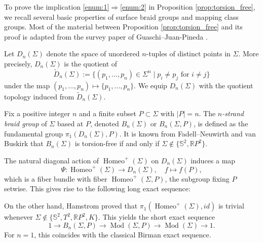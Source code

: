 \documentclass[12pt,a4paper]{amsart}
\numberwithin{equation}{section}
\DeclareMathOperator{\Mod}{Mod}
\DeclareMathOperator{\Homeo}{Homeo}
\theoremstyle{plain}
\theoremstyle{definition}
\theoremstyle{remark}
\begin{document}
To prove the implication \eqref{enum:1}$\Rightarrow$\eqref{enum:2} in Proposition \ref{prop:torsion_free}, we recall several basic properties of surface braid groups and mapping class groups.
Most of the material between Proposition \ref{prop:torsion_free} and its proof is adapted from the survey paper of Guaschi--Juan-Pineda \cite{MR3382024}.

Let $D_n(\Sigma)$ denote the space of unordered $n$-tuples of distinct points in $\Sigma$.
More precisely, $D_n(\Sigma)$ is the quotient of
\[
\tilde{D}_n(\Sigma) := \{ (p_1, \dots, p_n) \in \Sigma^n \mid p_i \neq p_j \text{ for } i \neq j \}
\]
under the map $(p_1, \dots, p_n) \mapsto \{p_1, \dots, p_n\}$.
We equip $D_n(\Sigma)$ with the quotient topology induced from $\tilde{D}_n(\Sigma)$.

Fix a positive integer $n$ and a finite subset $P \subset \Sigma$ with $|P| = n$.
The \emph{$n$-strand braid group} of $\Sigma$ based at $P$, denoted $B_n(\Sigma)$ or $B_n(\Sigma, P)$, is defined as the fundamental group $\pi_1(D_n(\Sigma), P)$.
It is known from Fadell--Neuwirth \cite{MR141126} and van Buskirk \cite{MR189013} that $B_n(\Sigma)$ is torsion-free if and only if $\Sigma \notin \{\mathbb{S}^2, \mathbb{R}P^2\}$.

The natural diagonal action of $\Homeo^+(\Sigma)$ on $D_n(\Sigma)$ induces a map
\[
\Psi: \Homeo^+(\Sigma) \to D_n(\Sigma), \quad f \mapsto f(P),
\]
which is a fiber bundle with fiber $\Homeo^+(\Sigma, P)$, the subgroup fixing $P$ setwise.
This gives rise to the following long exact sequence:
\begin{center}
\end{center}

On the other hand, Hamstrom \cite{MR202140} proved that $\pi_1(\Homeo^+(\Sigma), id)$ is trivial whenever $\Sigma \notin \{\mathbb{S}^2, T^2, \mathbb{R}P^2, K\}$.
This yields the short exact sequence
\[
1 \to B_n(\Sigma, P) \to \Mod(\Sigma, P) \to \Mod(\Sigma) \to 1.
\]
For $n = 1$, this coincides with the classical Birman exact sequence.
\end{document}
